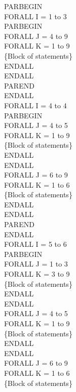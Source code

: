 \noindent PARBEGIN \\
FORALL I = 1 to 3\\
\indent PARBEGIN\\
\indent FORALL J = 4 to 9\\
\indent \indent FORALL K = 1 to 9\\
\indent \indent \indent \{Block of statements\}\\
\indent \indent ENDALL\\
\indent ENDALL\\
\indent PAREND\\
ENDALL\\
FORALL I = 4 to 4\\
\indent PARBEGIN\\
\indent FORALL J = 4 to 5\\
\indent \indent FORALL K = 1 to 9\\
\indent \indent \indent \{Block of statements\}\\
\indent \indent ENDALL\\
\indent ENDALL\\
\indent FORALL J = 6 to 9\\
\indent \indent FORALL K = 1 to 6\\
\indent \indent \indent \{Block of statements\} \\
\indent \indent ENDALL\\
\indent ENDALL\\
\indent PAREND\\
ENDALL\\
FORALL I = 5 to 6 \\
\indent PARBEGIN\\
\indent FORALL J = 1 to 3\\
\indent \indent FORALL K = 3 to 9\\
\indent \indent \indent \{Block of statements\}\\
\indent \indent ENDALL\\
\indent ENDALL\\
\indent FORALL J = 4 to 5\\
\indent \indent FORALL K = 1 to 9\\
\indent \indent \indent \{Block of statements\}\\
\indent \indent ENDALL\\
\indent ENDALL\\
\indent FORALL J = 6 to 9\\
\indent \indent FORALL K = 1 to 6\\
\indent \indent \indent \{Block of statements\}\\

